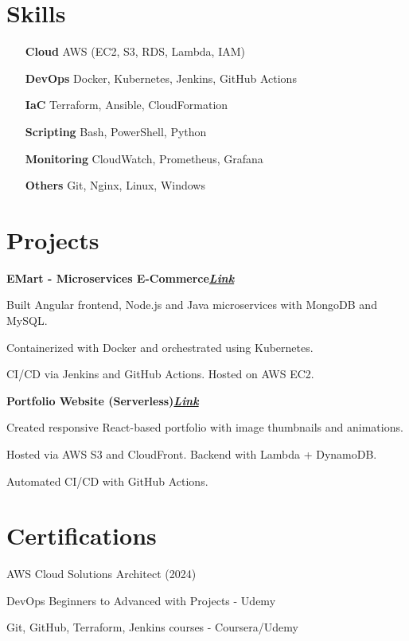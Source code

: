 \documentclass[letterpaper,10pt]{article}
\newcommand{\heading}[2]{
\hspace{10pt}#1\hfill#2\
}
\newcommand{\headingBf}[2]{
\heading{\textbf{#1}}{\textbf{#2}}
}
\newenvironment{resume_list}{
\vspace{-7pt}
\begin{itemize}[itemsep=-2px, parsep=1pt, leftmargin=30pt]
}{
\end{itemize}
}
\begin{document}
\section{Skills}
\begin{multicols}{2}
\begin{itemize}[itemsep=-2px, parsep=1pt, leftmargin=75pt]
\item[\textbf{Cloud}] AWS (EC2, S3, RDS, Lambda, IAM)
\item[\textbf{DevOps}] Docker, Kubernetes, Jenkins, GitHub Actions
\item[\textbf{IaC}] Terraform, Ansible, CloudFormation
\item[\textbf{Scripting}] Bash, PowerShell, Python
\item[\textbf{Monitoring}] CloudWatch, Prometheus, Grafana
\item[\textbf{Others}] Git, Nginx, Linux, Windows
\end{itemize}
\end{multicols}

\section{Projects}
\headingBf{EMart - Microservices E-Commerce}{\href{https://github.com/Rakesh04107/EMart-App}{\small\textit{Link}}}
\begin{resume_list}
\item Built Angular frontend, Node.js and Java microservices with MongoDB and MySQL.
\item Containerized with Docker and orchestrated using Kubernetes.
\item CI/CD via Jenkins and GitHub Actions. Hosted on AWS EC2.
\end{resume_list}

\headingBf{Portfolio Website (Serverless)}{\href{https://github.com/Rakesh04107/portfolio}{\small\textit{Link}}}
\begin{resume_list}
\item Created responsive React-based portfolio with image thumbnails and animations.
\item Hosted via AWS S3 and CloudFront. Backend with Lambda + DynamoDB.
\item Automated CI/CD with GitHub Actions.
\end{resume_list}

\section{Certifications}
\begin{resume_list}\item AWS Cloud Solutions Architect (2024)
\item DevOps Beginners to Advanced with Projects - Udemy
\item Git, GitHub, Terraform, Jenkins courses - Coursera/Udemy
\end{resume_list}
\end{document}
